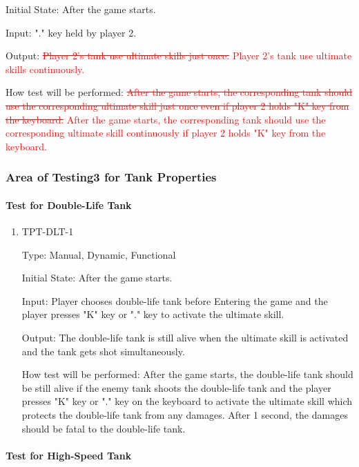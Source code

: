 \documentclass[12pt, titlepage]{article}
\begin{document}
\begin{enumerate}
Initial State: After the game starts.
					
Input: "." key held by player 2.
					
Output: \textcolor{red}{\sout{Player 2's tank use ultimate skills just once.}} \textcolor{red}{Player 2's tank use ultimate skills continuously.}
					
How test will be performed: \textcolor{red}{\sout{After the game starts, the corresponding tank should use the corresponding ultimate skill just once even if player 2 holds "K" key from the keyboard.}} \textcolor{red}{After the game starts, the corresponding tank should use the corresponding ultimate skill continuously if player 2 holds "K" key from the keyboard.}

\end{enumerate}

\subsubsection{Area of Testing3 for Tank Properties}

\paragraph{Test for Double-Life Tank}

\begin{enumerate}

\item{TPT-DLT-1\\}

Type: Manual, Dynamic, Functional
					
Initial State: After the game starts.
					
Input: Player chooses double-life tank before Entering the game and the player presses "K" key or "." key to activate the ultimate skill.
					
Output: The double-life tank is still alive when the ultimate skill is activated and the tank gets shot simultaneously.
					
How test will be performed: After the game starts, the double-life tank should be still alive if the enemy tank shoots the double-life tank and the player presses "K" key or "." key on the keyboard to activate the ultimate skill which protects the double-life tank from any damages. After 1 second, the damages should be fatal to the double-life tank.

\end{enumerate}

\paragraph{Test for High-Speed Tank}
\end{document}

